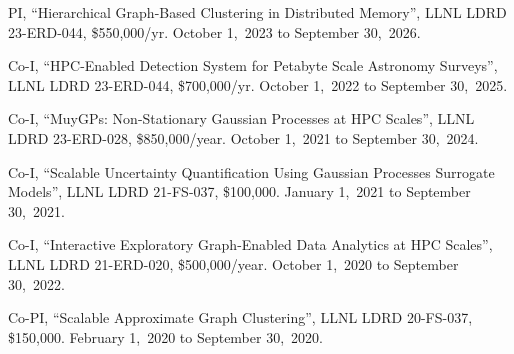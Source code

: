 \begin{innerlist}

  \item PI,
  ``Hierarchical Graph-Based Clustering in Distributed Memory'',
  LLNL LDRD 23-ERD-044,
  \$550,000/yr.
  October 1,~2023 to September 30,~2026.

  \item Co-I,
  ``HPC-Enabled Detection System for Petabyte Scale Astronomy Surveys'',
  LLNL LDRD 23-ERD-044,
  \$700,000/yr.
  October 1,~2022 to September 30,~2025.

  \item Co-I,
  ``MuyGPs: Non-Stationary Gaussian Processes at HPC Scales'',
  LLNL LDRD 23-ERD-028,
  \$850,000/year.
  October 1,~2021 to September 30,~2024.

  \item Co-I,
  ``Scalable Uncertainty Quantification Using Gaussian Processes Surrogate Models'',
  LLNL LDRD 21-FS-037,
  \$100,000.
  January 1,~2021 to September 30,~2021.

  \item Co-I,
  ``Interactive Exploratory Graph-Enabled Data Analytics at HPC Scales'',
  LLNL LDRD 21-ERD-020,
  \$500,000/year.
  October 1,~2020 to September 30,~2022.

  \item Co-PI,
  ``Scalable Approximate Graph Clustering'',
  LLNL LDRD 20-FS-037,
  \$150,000.
  February 1,~2020 to September 30,~2020.

\end{innerlist}
